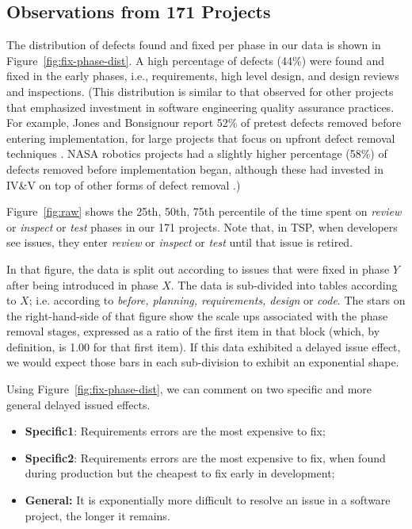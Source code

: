 \documentclass{sig-alternate}
\newcommand{\bi}{\begin{itemize}}%
\newcommand{\ei}{\end{itemize}}
\newcommand{\fig}[1]{Figure~\ref{fig:#1}}
\begin{document}
\subsection{Observations from 171 Projects}

The distribution of defects found and fixed per phase in our data is shown in Figure~\ref{fig:fix-phase-dist}. A high percentage of defects (44\%) were found and fixed in the early phases, i.e., requirements, high level design, and design reviews and inspections. (This distribution is similar to that observed for other projects that emphasized investment in software engineering quality assurance practices. For example, Jones and Bonsignour report 52\% of pretest defects removed before entering implementation, for large projects that focus on upfront defect removal techniques \cite{jones12}. NASA robotics projects had a slightly higher percentage (58\%) of defects removed before implementation began, although these had invested in IV\&V on top of other forms of defect removal \cite{me08a}.)  

\fig{raw} shows the 25th, 50th, 75th percentile
of the time spent on {\em review} or {\em inspect} or {\em test} phases
in our 171 projects.
Note that, in TSP, when developers see issues, they enter {\em review} or 
{\em inspect} or {\em test}
until that issue is retired.

In that figure, the data is split out according to issues that were fixed in phase $Y$ after
being introduced in phase $X$. The data is sub-divided into tables according to $X$;
i.e. according to {\em before, planning, requirements, design} or {\em  code}. 
The stars on the right-hand-side of that figure show the scale ups associated with the phase removal stages,
expressed as a ratio of the first item in that block (which, by definition, is 1.00 for
that first item).
If  this data exhibited a delayed issue effect,  we would expect those bars in each sub-division to exhibit an
exponential shape.

Using Figure~\ref{fig:fix-phase-dist}, we can comment on two specific and more general
delayed issued effects. 
\bi
\item {\bf Specific1}: Requirements errors are the most expensive to fix;
\item {\bf Specific2}: Requirements errors are the most expensive to fix, 
 when found during production but the cheapest to fix early in development;
 \item {\bf General:}  It is exponentially more  difficult  to resolve an issue in a software project, the   longer it remains.
\ei
\end{document}

